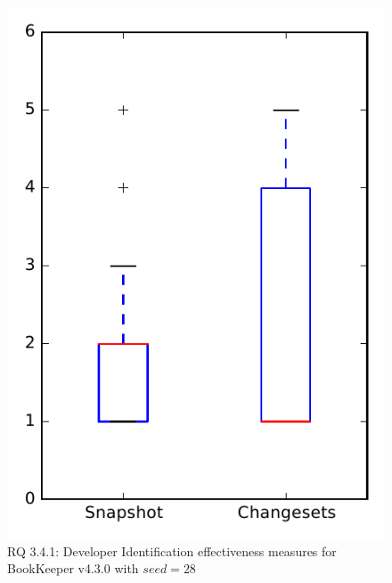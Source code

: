 
\begin{figure}
\centering
\includegraphics[height=0.4\textheight]{figures/dit_seed/rq1_bookkeeper_28}
\caption{RQ 3.4.1: Developer Identification effectiveness measures for BookKeeper v4.3.0 with $seed=28$}
\label{fig:dit_seed:rq1:bookkeeper}
\end{figure}
